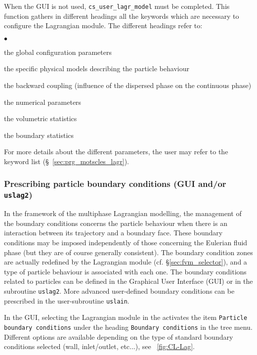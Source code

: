 {{{

\noindent
When the GUI is not used, \texttt{cs\_user\_lagr\_model} must be completed. This function
gathers in different headings all the keywords which are
necessary to configure the Lagrangian module. The different headings refer to:
\begin{list}{$\bullet$}{}
\item the global configuration parameters
\item the specific physical models describing the particle behaviour
\item the backward coupling (influence of the dispersed phase on the
      continuous phase)
\item the numerical parameters
\item the volumetric statistics
\item the boundary statistics
\end{list}
%
\noindent
For more details about the different parameters, the user may refer to the
keyword list (\S~\ref{sec:prg_motscles_lagr}).%


\subsubsection{Prescribing particle boundary conditions (GUI and/or \texttt{uslag2})}
In the framework of the multiphase Lagrangian modelling, the management of the boundary conditions concerns the particle behaviour when there is an interaction between its trajectory and a boundary face. These boundary conditions may be imposed independently of those concerning the Eulerian fluid phase (but they are of course generally consistent). The boundary condition zones are actually redefined by the Lagrangian module (cf. \S\ref{sec:fvm_selector}), and a type of particle behaviour is associated with each one. The boundary conditions related to particles can be defined in the Graphical User Interface (GUI) or in the subroutine \texttt{uslag2}. More advanced user-defined boundary conditions can be prescribed in the user-subroutine \texttt{uslain}.


 In the GUI, selecting the Lagrangian module in the activates the item \texttt{Particle boundary conditions} under the heading \texttt{Boundary conditions} in the tree menu. Different options are available depending on the type of standard boundary conditions selected (wall, inlet/outlet, etc...),
 see \figurename~\ref{fig:CL-Lag}.

}}}
